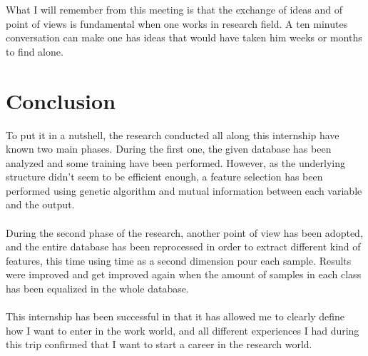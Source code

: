 \documentclass{report}
\begin{document}
		What I will remember from this meeting is that the exchange of ideas and of point of views is fundamental when one works in research field. A ten minutes conversation can make one has ideas that would have taken him weeks or months to find alone.
		
	\chapter{Conclusion}
	
	To put it in a nutshell, the research conducted all along this internship have known two main phases. During the first one, the given database has been analyzed and some training have been performed. However, as the underlying structure didn't seem to be efficient enough, a feature selection has been performed using genetic algorithm and mutual information between each variable and the output.\\\\
	During the second phase of the research, another point of view has been adopted, and the entire database has been reprocessed in order to extract different kind of features, this time using time as a second dimension pour each sample. Results were improved and get improved again when the amount of samples in each class has been equalized in the whole database.\\\\
	This internship has been successful in that it has allowed me to clearly define how I want to enter in the work world, and all different experiences I had during this trip confirmed that I want to start a career in the research world.
	
	
	
	
	
\end{document}
